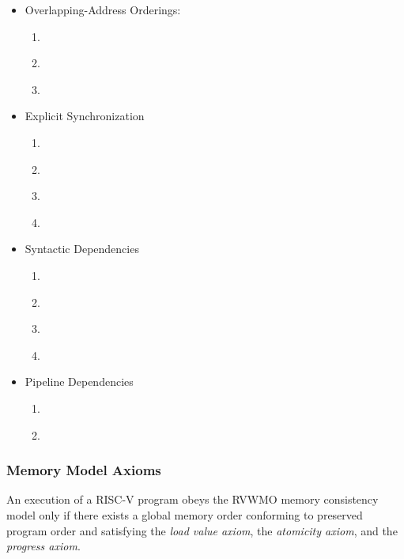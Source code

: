 \begin{itemize}
  \item Overlapping-Address Orderings:
    \begin{enumerate}
      \item\label{ppo:->st} \ppost
      \item\label{ppo:rdw} \ppordw
      \item\label{ppo:amoforward} \ppoamoforward
    \end{enumerate}
  \item Explicit Synchronization
    \begin{enumerate}[resume]
      \item\label{ppo:fence} \ppofence
      \item\label{ppo:acquire} \ppoacquire
      \item\label{ppo:release} \pporelease
      \item\label{ppo:rcsc} \pporcsc
    \end{enumerate}
  \item Syntactic Dependencies
    \begin{enumerate}[resume]
      \item\label{ppo:addr} \ppoaddr
      \item\label{ppo:data} \ppodata
      \item\label{ppo:ctrl} \ppoctrl
      \item\label{ppo:pair} \ppopair
    \end{enumerate}
  \item Pipeline Dependencies
    \begin{enumerate}[resume]
      \item\label{ppo:addrdatarfi} \ppoaddrdatarfi
      \item\label{ppo:addrpo} \ppoaddrpo
    \end{enumerate}
\end{itemize}

\subsubsection*{Memory Model Axioms}

An execution of a RISC-V program obeys the RVWMO memory consistency model only if there exists a global memory order conforming to preserved program order and satisfying the {\em load value axiom}, the {\em atomicity axiom}, and the {\em progress axiom}.

